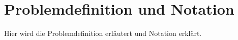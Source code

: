 \chapter{Problemdefinition und Notation}
\label{ch:ProblemdefinitionUndNotation}

Hier wird die Problemdefinition erläutert und Notation erklärt.